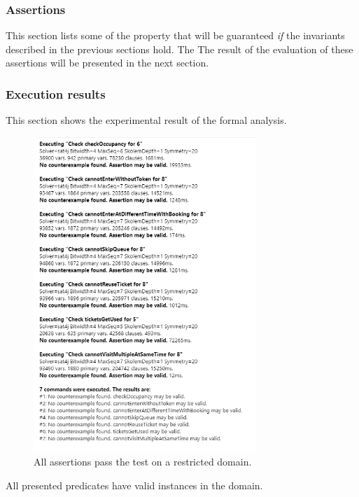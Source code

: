 \subsubsection{Assertions}
This section lists some of the property that will be guaranteed \emph{if} the invariants described in the previous sections hold. The The result of the evaluation of these assertions will be presented in the next section.

\subsubsection{Execution results}
This section shows the experimental result of the formal analysis.

\begin{figure}[H]
    \centering
    \includegraphics[width=0.75\textwidth]{Images/Alloy/check_assertions.png}
    \caption{All assertions pass the test on a restricted domain.}
\end{figure}

\pagebreak


All presented predicates have valid instances in the domain.

